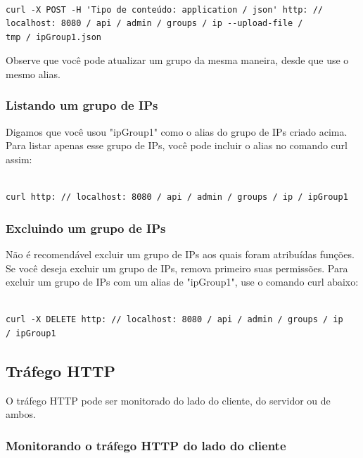 \documentclass[12pt,hidelinks]{article}
\begin{document}
\begin{verbatim}

curl -X POST -H 'Tipo de conteúdo: application / json' http: //
localhost: 8080 / api / admin / groups / ip --upload-file / 
tmp / ipGroup1.json

\end{verbatim}

Observe que você pode atualizar um grupo da mesma maneira, desde que use o mesmo alias.

\subsubsection{Listando um grupo de IPs}

\qquad Digamos que você usou "ipGroup1" como o alias do grupo de IPs criado acima. Para listar apenas esse grupo de IPs, você pode incluir o alias no comando curl assim:

\begin{verbatim}

curl http: // localhost: 8080 / api / admin / groups / ip / ipGroup1

\end{verbatim}

\subsubsection{Excluindo um grupo de IPs}

\qquad Não é recomendável excluir um grupo de IPs aos quais foram atribuídas funções. Se você deseja excluir um grupo de IPs, remova primeiro suas permissões. Para excluir um grupo de IPs com um alias de "ipGroup1", use o comando curl abaixo:

\begin{verbatim}

curl -X DELETE http: // localhost: 8080 / api / admin / groups / ip 
/ ipGroup1

\end{verbatim}

\subsection{Tráfego HTTP}

\qquad O tráfego HTTP pode ser monitorado do lado do cliente, do servidor ou de ambos.

\subsubsection{Monitorando o tráfego HTTP do lado do cliente}
\end{document}
